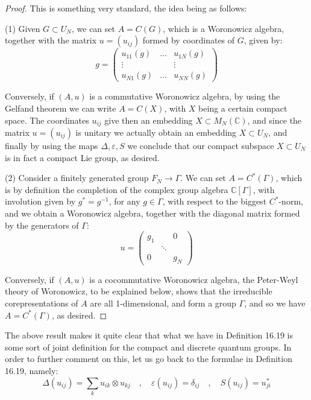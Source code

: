 \documentclass[12pt]{amsbook}
\begin{document}
\begin{proof}
This is something very standard, the idea being as follows:

\medskip

(1) Given $G\subset U_N$, we can set $A=C(G)$, which is a Woronowicz algebra, together with the matrix $u=(u_{ij})$ formed by coordinates of $G$, given by:
$$g=\begin{pmatrix}
u_{11}(g)&\ldots&u_{1N}(g)\\
\vdots&&\vdots\\
u_{N1}(g)&\ldots&u_{NN}(g)
\end{pmatrix}$$

Conversely, if $(A,u)$ is a commutative Woronowicz algebra, by using the Gelfand theorem we can write $A=C(X)$, with $X$ being a certain compact space. The coordinates $u_{ij}$ give then an embedding $X\subset M_N(\mathbb C)$, and since the matrix $u=(u_{ij})$ is unitary we actually obtain an embedding $X\subset U_N$, and finally by using the maps $\Delta,\varepsilon,S$ we conclude that our compact subspace $X\subset U_N$ is in fact a compact Lie group, as desired.

\medskip

(2) Consider a finitely generated group $F_N\to\Gamma$. We can set $A=C^*(\Gamma)$, which is by definition the completion of the complex group algebra $\mathbb C[\Gamma]$, with involution given by $g^*=g^{-1}$, for any $g\in\Gamma$, with respect to the biggest $C^*$-norm, and we obtain a Woronowicz algebra, together with the diagonal matrix formed by the generators of $\Gamma$:
$$u=\begin{pmatrix}
g_1&&0\\
&\ddots&\\
0&&g_N
\end{pmatrix}$$

Conversely, if $(A,u)$ is a cocommutative Woronowicz algebra, the Peter-Weyl theory of Woronowicz, to be explained below, shows that the irreducible corepresentations of $A$ are all 1-dimensional, and form a group $\Gamma$, and so we have $A=C^*(\Gamma)$, as desired.
\end{proof}

The above result makes it quite clear that what we have in Definition 16.19 is some sort of joint definition for the compact and discrete quantum groups. In order to further comment on this, let us go back to the formulae in Definition 16.19, namely:
$$\Delta(u_{ij})=\sum_ku_{ik}\otimes u_{kj}\quad,\quad
\varepsilon(u_{ij})=\delta_{ij}\quad,\quad
S(u_{ij})=u_{ji}^*$$
\end{document}
